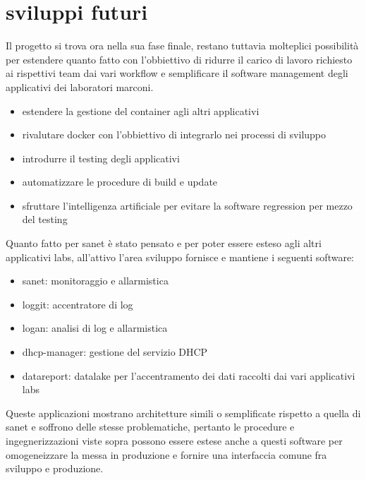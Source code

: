 \chapter{sviluppi futuri}

Il progetto si trova ora nella sua fase finale, restano tuttavia molteplici possibilità per estendere quanto fatto con l'obbiettivo di ridurre il carico di lavoro richiesto ai rispettivi team dai vari workflow e semplificare il software management degli applicativi dei laboratori marconi.

\begin{itemize}
  \item{estendere la gestione del container agli altri applicativi}
  \item{rivalutare docker con l'obbiettivo di integrarlo nei processi di sviluppo}
  \item{introdurre il testing degli applicativi}
  \item{automatizzare le procedure di build e update}
  \item{sfruttare l'intelligenza artificiale per evitare la software regression per mezzo del testing}
\end{itemize}

Quanto fatto per sanet è stato pensato e per poter essere esteso agli altri applicativi labs, all'attivo l'area sviluppo fornisce e mantiene i seguenti software:

\begin{itemize}
  \item{sanet: monitoraggio e allarmistica}
  \item{loggit: accentratore di log}
  \item{logan: analisi di log e allarmistica}
  \item{dhcp-manager: gestione del servizio DHCP}
  \item{datareport: datalake per l'accentramento dei dati raccolti dai vari applicativi labs}
\end{itemize}

Queste applicazioni mostrano architetture simili o semplificate rispetto a quella di sanet e soffrono delle stesse problematiche, pertanto le procedure e ingegnerizzazioni viste sopra possono essere estese anche a questi software per omogeneizzare la messa in produzione e fornire una interfaccia comune fra sviluppo e produzione.

